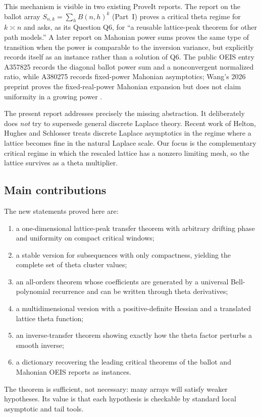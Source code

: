 \documentclass[11pt,a4paper]{article}
\numberwithin{equation}{section}
\theoremstyle{definition}
\begin{document}
This mechanism is visible in two existing ProveIt reports. The report on
the ballot array $S_{n,k}=\sum_h B(n,h)^k$ (Part~I) proves a critical
theta regime for $k\asymp n$ and asks, as its Question Q6, for ``a
reusable lattice-peak theorem for other path models.'' A later report on
Mahonian power sums proves the same type of transition when the power is
comparable to the inversion variance, but explicitly records itself as an
instance rather than a solution of Q6. The public OEIS entry A357825
records the diagonal ballot power sum and a nonconvergent normalized
ratio, while A380275 records fixed-power Mahonian asymptotics; Wang's 2026
preprint proves the fixed-real-power Mahonian expansion but does not claim
uniformity in a growing power \cite{oeisa,lptA380275,lptWang}.

The present report addresses precisely the missing abstraction. It
deliberately does \emph{not} try to supersede general discrete Laplace
theory. Recent work of Helton, Hughes and Schlosser \cite{discretelaplace}
treats discrete Laplace asymptotics in the regime where a lattice becomes
fine in the natural Laplace scale. Our focus is the complementary
critical regime in which the rescaled lattice has a nonzero limiting
mesh, so the lattice survives as a theta multiplier.

\subsection*{Main contributions}
The new statements proved here are:
\begin{enumerate}[label=(\roman*)]
\item a one-dimensional lattice-peak transfer theorem with arbitrary
 drifting phase and uniformity on compact critical windows;
\item a stable version for subsequences with only compactness, yielding
 the complete set of theta cluster values;
\item an all-orders theorem whose coefficients are generated by a
 universal Bell-polynomial recurrence and can be written through theta
 derivatives;
\item a multidimensional version with a positive-definite Hessian and a
 translated lattice theta function;
\item an inverse-transfer theorem showing exactly how the theta factor
 perturbs a smooth inverse;
\item a dictionary recovering the leading critical theorems of the ballot
 and Mahonian OEIS reports as instances.
\end{enumerate}
The theorem is sufficient, not necessary: many arrays will satisfy weaker
hypotheses. Its value is that each hypothesis is checkable by standard
local asymptotic and tail tools.
\end{document}
